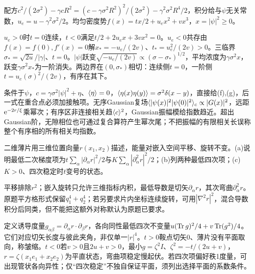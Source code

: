 \begin{solution}
配方$c^2/(2\sigma^2)-\gamma cR^2=(c-\gamma\sigma^2R^2)^2/(2\sigma^2)-\gamma^2\sigma^2R^4/2$，积分给与$\psi$无关常数，$u_e=u-\gamma^2\sigma^2/2$。均匀密度势$f(x)=tx/2+u_ex^2+vx^3$，$x=|\psi|^2\ge0$。

$u_e>0$时$t=0$连续，$t<0$满足$t/2+2u_ex+3vx^2=0$。$u_e<0$共存由$f(x)=f(0),f'(x)=0$解$x_*=-u_e/(2v)$、$t_*=u_e^2/(2v)>0$。三临界$\sigma_*=\sqrt{2u}/|\gamma|$、$t=0$。$|\psi|$跃变$\sqrt{-u_e/(2v)}\propto(\sigma-\sigma_*)^{1/2}$，平均浓度为$\gamma\sigma^2x$，跃变$\gamma\sigma^2x_*$为一阶消失。两边界在$(0,\sigma_*)$相切：连续侧$t=0$，一阶侧$t=u_e(\sigma)^2/(2v)$，有序在其下。
\begin{center}\end{center}
条件于$\psi$，$c=\gamma\sigma^2|\psi|^2+\eta$、$\langle \eta\rangle=0$，$\langle \eta(x)\eta(y)\rangle=\sigma^2\delta(x-y)$，直接给(f),(g)，后一式在重合点必须加接触项。无序Gaussian复场$\langle |\psi(x)|^2|\psi(0)|^2\rangle_c\propto|G(x)|^2$，远距$\mathrm e^{-2r/\xi}$乘幂次；有序区非连接相关趋$\langle c\rangle^2$，Gaussian振幅模给指数趋近。超出Gaussian阶，无隙相位也可通过复合算符产生幂次尾；不把振幅的有限相关长误称整个有序相的所有相关均指数。
\end{solution}
\begin{exercise}[原题4(a)--(c)]\label{p:334-1-4}
二维薄片用三维位置向量$r(x_1,x_2)$描述，能量对嵌入空间平移、旋转不变。(a)说明最低二次梯度项为$t\sum_\alpha|\partial_\alpha r|^2/2$与$K\sum_\alpha|\partial_\alpha^2r|^2/2$；(b)列两种最低四次项；(c)$K>0$、四次稳定时$t$变号的状态。
\end{exercise}
\begin{solution}
平移排除$r^2$；嵌入旋转只允许三维指标内积，最低导数是切矢$\partial_\alpha r$，其次弯曲$\partial_\alpha^2r$。原题平方格形式保留$q_1^4+q_2^4$；若另要求片内坐标连续旋转，可用$|\nabla^2r|^2$，混合导数积分后同类，但不能把这额外对称默认为原题已要求。

定义诱导度量$g_{\alpha\beta}=\partial_\alpha r\cdot\partial_\beta r$，各向同性最低四次不变量$u(\operatorname{Tr} g)^2/4+v\operatorname{Tr}(g^2)/4$。它们对应切矢长度与彼此夹角，非仅单一$|r|^4$。$t>0$鞍点切矢0、薄片没有平面取向，称皱缩。$t<0$若$v>0$且$2u+v>0$，最小$g=\zeta^2I$、$\zeta^2=-t/(2u+v)$，$r=\zeta(x_1e_1+x_2e_2)$为平直状态，弯曲项稳定慢起伏。若四次项偏好秩1度量，可出现管状各向异性；仅“四次稳定”不独自保证平面，须列出选择平面的系数条件。
\end{solution}
